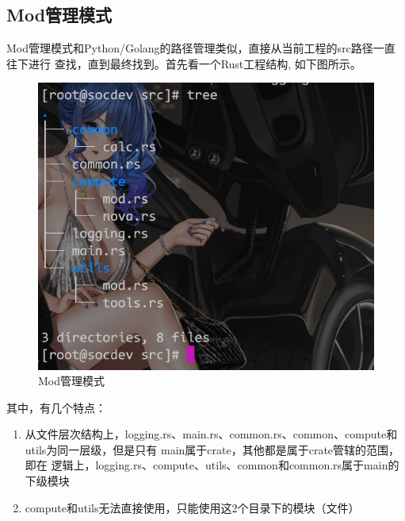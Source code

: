 \subsection{Mod管理模式}
Mod管理模式和Python/Golang的路径管理类似，直接从当前工程的src路径一直往下进行
查找，直到最终找到。首先看一个Rust工程结构, 如下图所示。
\begin{figure}[H]
  \centering
  \includegraphics[scale=0.4]{rust_mod.png}
  \caption{Mod管理模式}
  \label{fig:rust_mod}
\end{figure}
其中，有几个特点：
\begin{enumerate}
  \item 从文件层次结构上，logging.rs、main.rs、common.rs、common、compute和
utils为同一层级，但是只有 main属于crate，其他都是属于crate管辖的范围，即在
逻辑上，logging.rs、compute、utils、common和common.rs属于main的下级模块
  \item compute和utils无法直接使用，只能使用这2个目录下的模块（文件）
\end{enumerate}

